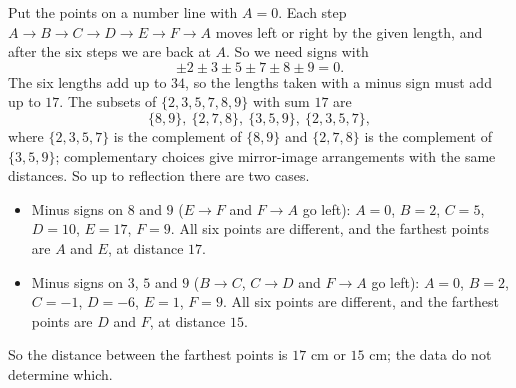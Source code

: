 Put the points on a number line with $A=0$. Each step $A\to B\to C\to D\to E\to F\to A$ moves left or right by the given length, and after the six steps we are back at $A$. So we need signs with
\[
\pm2\pm3\pm5\pm7\pm8\pm9=0 .
\]
The six lengths add up to $34$, so the lengths taken with a minus sign must add up to $17$. The subsets of $\{2,3,5,7,8,9\}$ with sum $17$ are
\[
\{8,9\},\ \{2,7,8\},\ \{3,5,9\},\ \{2,3,5,7\},
\]
where $\{2,3,5,7\}$ is the complement of $\{8,9\}$ and $\{2,7,8\}$ is the complement of $\{3,5,9\}$; complementary choices give mirror-image arrangements with the same distances. So up to reflection there are two cases.
\begin{itemize}
\item Minus signs on $8$ and $9$ ($E\to F$ and $F\to A$ go left): $A=0$, $B=2$, $C=5$, $D=10$, $E=17$, $F=9$. All six points are different, and the farthest points are $A$ and $E$, at distance $17$.
\item Minus signs on $3$, $5$ and $9$ ($B\to C$, $C\to D$ and $F\to A$ go left): $A=0$, $B=2$, $C=-1$, $D=-6$, $E=1$, $F=9$. All six points are different, and the farthest points are $D$ and $F$, at distance $15$.
\end{itemize}
So the distance between the farthest points is $\boxed{17\text{ cm or }15\text{ cm}}$; the data do not determine which.
